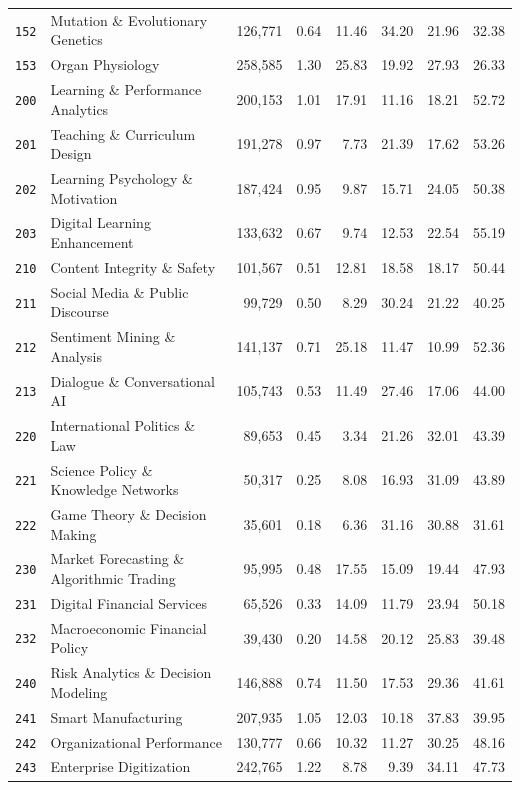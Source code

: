 \begin{longtable}{@{}l l r r r r r r@{}}
\texttt{152} & Mutation \& Evolutionary Genetics & 126,771 & 0.64 & 11.46 & 34.20 & 21.96 & 32.38 \\
\texttt{153} & Organ Physiology & 258,585 & 1.30 & 25.83 & 19.92 & 27.93 & 26.33 \\
\texttt{200} & Learning \& Performance Analytics & 200,153 & 1.01 & 17.91 & 11.16 & 18.21 & 52.72 \\
\texttt{201} & Teaching \& Curriculum Design & 191,278 & 0.97 & 7.73 & 21.39 & 17.62 & 53.26 \\
\texttt{202} & Learning Psychology \& Motivation & 187,424 & 0.95 & 9.87 & 15.71 & 24.05 & 50.38 \\
\texttt{203} & Digital Learning Enhancement & 133,632 & 0.67 & 9.74 & 12.53 & 22.54 & 55.19 \\
\texttt{210} & Content Integrity \& Safety & 101,567 & 0.51 & 12.81 & 18.58 & 18.17 & 50.44 \\
\texttt{211} & Social Media \& Public Discourse & 99,729 & 0.50 & 8.29 & 30.24 & 21.22 & 40.25 \\
\texttt{212} & Sentiment Mining \& Analysis & 141,137 & 0.71 & 25.18 & 11.47 & 10.99 & 52.36 \\
\texttt{213} & Dialogue \& Conversational AI & 105,743 & 0.53 & 11.49 & 27.46 & 17.06 & 44.00 \\
\texttt{220} & International Politics \& Law & 89,653 & 0.45 & 3.34 & 21.26 & 32.01 & 43.39 \\
\texttt{221} & Science Policy \& Knowledge Networks & 50,317 & 0.25 & 8.08 & 16.93 & 31.09 & 43.89 \\
\texttt{222} & Game Theory \& Decision Making & 35,601 & 0.18 & 6.36 & 31.16 & 30.88 & 31.61 \\
\texttt{230} & Market Forecasting \& Algorithmic Trading & 95,995 & 0.48 & 17.55 & 15.09 & 19.44 & 47.93 \\
\texttt{231} & Digital Financial Services & 65,526 & 0.33 & 14.09 & 11.79 & 23.94 & 50.18 \\
\texttt{232} & Macroeconomic Financial Policy & 39,430 & 0.20 & 14.58 & 20.12 & 25.83 & 39.48 \\
\texttt{240} & Risk Analytics \& Decision Modeling & 146,888 & 0.74 & 11.50 & 17.53 & 29.36 & 41.61 \\
\texttt{241} & Smart Manufacturing & 207,935 & 1.05 & 12.03 & 10.18 & 37.83 & 39.95 \\
\texttt{242} & Organizational Performance & 130,777 & 0.66 & 10.32 & 11.27 & 30.25 & 48.16 \\
\texttt{243} & Enterprise Digitization & 242,765 & 1.22 & 8.78 & 9.39 & 34.11 & 47.73 \\

\end{longtable}
